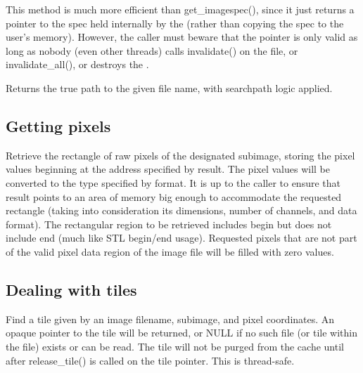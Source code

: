 This method is much more efficient than {\cf get_imagespec()}, since it
just returns a pointer to the spec held internally by the \ImageCache
(rather than copying the spec to the user's memory).  However, the
caller must beware that the pointer is only valid as long as nobody
(even other threads) calls {\cf invalidate()} on the file, or {\cf
  invalidate_all()}, or destroys the \ImageCache.
\apiend

Returns the true path to the given file name, with searchpath logic
applied.
\apiend

\subsection{Getting pixels}
\label{sec:imagecache:api:getpixels}


Retrieve the rectangle of raw pixels
of the designated {\cf subimage}, storing the pixel values
beginning at the address specified by result.  The pixel values will be
converted to the type specified by {\cf format}.  It is up to the caller
to ensure that result points to an area of memory big enough to
accommodate the requested rectangle (taking into consideration its
dimensions, number of channels, and data format).
The rectangular region to be retrieved includes {\cf begin} but does not
include {\cf end} (much like STL begin/end usage).
Requested pixels that are not part of the valid pixel data region of the
image file will be filled with zero values.
\apiend

\subsection{Dealing with tiles}
\label{sec:imagecache:api:tiles}

Find a tile given by an image {\cf filename}, {\cf subimage}, and pixel
coordinates.  An opaque pointer to the tile will be returned,
or {\cf NULL} if no such file (or tile within the file) exists or can
be read.  The tile will not be purged from the cache until 
after {\cf release_tile()} is called on the tile pointer.  This is
thread-safe.
\apiend

